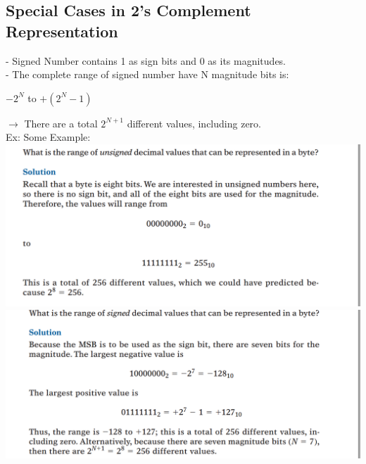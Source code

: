 \documentclass[12pt]{article}
\begin{document}
\subsection{Special Cases in 2's Complement Representation}
- Signed Number contains 1 as sign bits and 0 as its magnitudes.\\
- The complete range of signed number have N magnitude bits is:
\begin{center}
	$-2^N$ to $+ (2^N -1)$
\end{center}
$\rightarrow$ There are a total $2^{N+1}$ different values, including zero.\\
Ex: Some Example: \\
\includegraphics[scale = 0.6]{hinh24}
\bigbreak
\includegraphics[scale = 0.6]{hinh28}
\bigbreak
\end{document}
